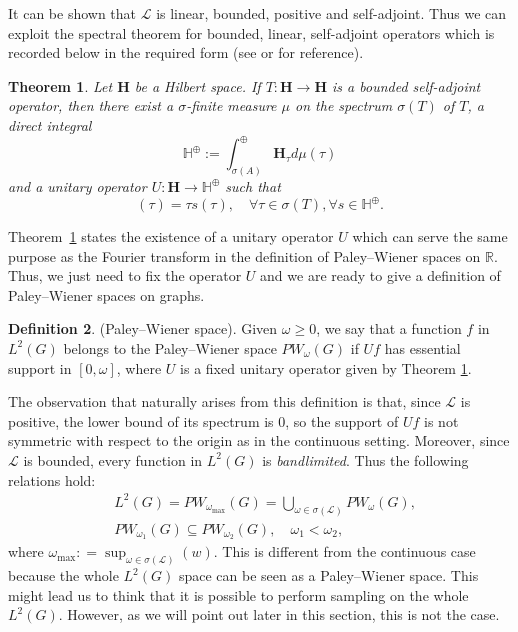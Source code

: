 \documentclass[12pt]{amsart}
\newtheorem{theorem}{Theorem}[section]
\theoremstyle{definition}
\newtheorem{definition}[theorem]{Definition}
\numberwithin{equation}{section}
\theoremstyle{definition}
\theoremstyle{remark}
\numberwithin{equation}{section}
\begin{document}
It can be shown that $\mathcal{L}$ is linear, bounded, positive and self-adjoint. Thus we can exploit the spectral theorem for bounded, linear, self-adjoint operators which is recorded below in the required form (see \cite{Hall} or \cite{Folland} for reference).
\begin{theorem}
\label{teo spett}
Let $\mathbf{H}$ be a Hilbert space. If $T: \mathbf{H} \longrightarrow \mathbf{H}$ is a bounded self-adjoint operator, then there exist a $\sigma$-finite measure $\mu$ on the spectrum $\sigma(T)$ of $T$, a direct integral 
\begin{equation}
 \mathbb{H}^{\oplus} := \int_{\sigma(A)}^{\oplus} \mathbf{H}_\tau d \mu(\tau)   
\end{equation}
and a unitary operator $U:\mathbf{H}\longrightarrow\mathbb{H}^{\oplus}$ such that
\begin{equation}
  [UTU^{-1}(s)](\tau) = \tau s(\tau), \quad \forall \tau \in \sigma(T), \forall s \in \mathbb{H}^{\oplus}.  
\end{equation}
\end{theorem}
Theorem~\ref{teo spett} states the existence of a unitary operator $U$ which can serve the same purpose as the Fourier transform in the definition of Paley--Wiener spaces on $\mathbb{R}$. Thus, we just need to fix the operator $U$ and we are ready to give a definition of Paley--Wiener spaces on graphs.
\begin{definition}
\label{def PW}
(Paley--Wiener space). Given $\omega \geq 0$, we say that a function $f$ in $L^{2}(G)$ belongs to the Paley--Wiener space $P W_\omega(G)$ if $Uf$ has essential support in $[0, \omega]$, where $U$ is a fixed unitary operator given by Theorem \ref{teo spett}.
\end{definition}
The observation that naturally arises from this definition is that, since $\mathcal{L}$ is positive, the lower bound of its spectrum is $0$, so the support of $Uf$ is not symmetric with respect to the origin as in the continuous setting. Moreover, since $\mathcal{L}$ is bounded, every function in $L^{2}(G)$ is \textit{bandlimited}. Thus the following relations hold:
\begin{equation}
\begin{split}
      &L^2(G)=P W_{\omega_{\mathrm{max}}}(G)=\bigcup_{\omega \in \sigma(\mathcal{L})} P W_\omega(G), \\
      &P W_{\omega_1}(G) \subseteq P W_{\omega_2}(G), \quad \omega_1<\omega_2, 
\end{split}
\end{equation}
where $\omega_{\mathrm{max}} : = \sup_{\omega \in \sigma(\mathcal{L})}(w)$. This is different from the continuous case because the whole $L^2(G)$ space can be seen as a Paley--Wiener space. This might lead us to think that it is possible to perform sampling on the whole $L^2(G)$. However, as we will point out later in this section, this is not the case.
\end{document}
